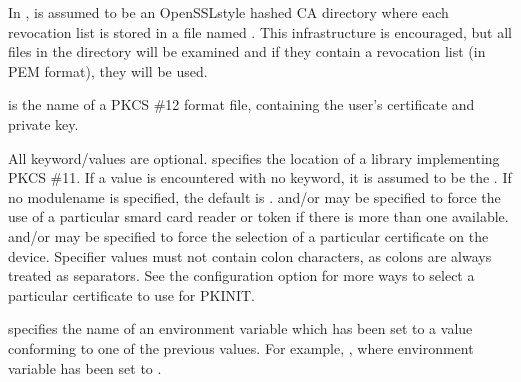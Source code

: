 \documentclass[letterpaper,10pt,english]{sphinxmanual}
\begin{document}
\begin{description}
\sphinxAtStartPar
In ,  is assumed to be an OpenSSL\sphinxhyphen{}style
hashed CA directory where each revocation list is stored in a file
named .  This infrastructure is encouraged,
but all files in the directory will be examined and if they
contain a revocation list (in PEM format), they will be used.

\sphinxAtStartPar
{} is the name of a PKCS \#12 format file, containing the
user’s certificate and private key.

\sphinxAtStartPar
All keyword/values are optional.   specifies the location
of a library implementing PKCS \#11.  If a value is encountered
with no keyword, it is assumed to be the .  If no
module\sphinxhyphen{}name is specified, the default is {\hyperref[\detokenize{mitK5defaults:paths}]{}}.
 and/or  may be specified to force the use of
a particular smard card reader or token if there is more than one
available.   and/or  may be specified to
force the selection of a particular certificate on the device.
Specifier values must not contain colon characters, as colons are
always treated as separators.  See the 
configuration option for more ways to select a particular
certificate to use for PKINIT.

\sphinxAtStartPar
{} specifies the name of an environment variable which has
been set to a value conforming to one of the previous values.  For
example, , where environment variable
 has been set to .

\end{description}
\end{document}
